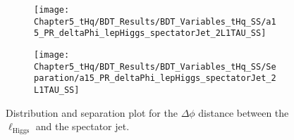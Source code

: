 \begin{figure}[h]
\centering
\begin{subfigure}{.45\textwidth}
  \centering
  \texttt{[image: Chapter5\_tHq/BDT\_Results/BDT\_Variables\_tHq\_SS/a15\_PR\_deltaPhi\_lepHiggs\_spectatorJet\_2L1TAU\_SS]}
\end{subfigure}%
\begin{subfigure}{.55\textwidth}
  \centering
  \texttt{[image: Chapter5\_tHq/BDT\_Results/BDT\_Variables\_tHq\_SS/Separation/a15\_PR\_deltaPhi\_lepHiggs\_spectatorJet\_2L1TAU\_SS]}
\end{subfigure}
\caption{Distribution and separation plot for the $\Delta \phi$ distance between the $\ell_{\text{Higgs}}$ and
the spectator jet.}
\label{fig:Appendix:BDTVARS:tHqSS:a15_PR_deltaPhi_lepHiggs_spectatorJet}
\end{figure}







